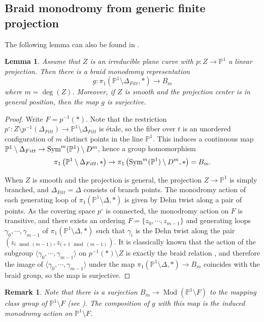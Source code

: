 \documentclass[12pt]{amsart}
\newcommand{\Sym}{\textup{Sym}}
\DeclareMathOperator{\Mod}{\mathrm{Mod}}%
\newtheorem{lemma}[theorem]{Lemma}
\newtheorem{remark}[theorem]{Remark}
\begin{document}
\subsection{Braid monodromy from generic finite projection}
The following lemma can also be found in \cite{Moishezon81}.
\begin{lemma}\label{lmm:curve-braid}
    Assume that $Z$ is an irreducible plane curve with $p\colon Z\to \mathbb P^1$ a linear projection.
    Then there is a braid monodromy representation
$$g\colon \pi_1(\mathbb P^1\setminus \Delta_{Fitt},*)\to B_m$$
where $m=\deg(Z)$. Moreover, if $Z$ is smooth and the projection center is in general position, then the map $g$ is surjective.
\end{lemma}
\begin{proof}
    Write $F= p^{-1} (\ast)$. Note that the restriction $p^{\circ}:Z\setminus p^{-1}(\Delta_{Fitt})\to\mathbb{P}^1\setminus\Delta_{Fitt}$ is \'etale, so the fiber over
$t$ is an unordered configuration of 
$m$ distinct points in the line $\mathbb P^1$. This induces a continuous map $\mathbb{P}^1\setminus\Delta_{Fitt}\to\Sym^m (\mathbb{P}^1)\setminus D^m$, hence a group homomorphism $$\pi_1\left(\mathbb{P}^1\setminus\Delta_{Fitt} ,\ast\right)\to\pi_1\left(\Sym^m (\mathbb{P}^1)\setminus D^m,\ast\right)=B_m.$$ 
    
    When $Z$ is smooth and the projection is general, the projection $Z\to\mathbb{P}^1$ is simply branched, and $\Delta_{Fitt}=\Delta$ consists of branch points. The monodromy action of each generating loop of $\pi_1\left(\mathbb{P}^1\setminus\Delta ,\ast\right)$ is given by Dehn twist along a pair of points. As the covering space $p^{\circ}$ is connected, the monodromy action on $F$ is transitive, and there exists an ordering $F=\{z_0,\dotsb, z_{m-1}\}$ and generating loops $\gamma_0,\dotsb,\gamma_{m-1}$ of $\pi_1\left(\mathbb{P}^1\setminus\Delta ,\ast\right)$ such that $\gamma_i$ is the Dehn twist along the pair $(z_{i\mod (m-1)}, z_{i+1 \mod (m-1)})$. It is classically known that the action of the subgroup $\langle\gamma_0,\dotsb,\gamma_{m-1}\rangle$ on $p^{-1} (\ast)\setminus Z$ is exactly the braid relation \cite{Artin25}, and therefore the image of $\langle\gamma_0,\dotsb,\gamma_{m-1}\rangle$ under the map $\pi_1\left(\mathbb{P}^1\setminus\Delta ,\ast\right)\to B_m$ coincides with the braid group, so the map is surjective.
\end{proof}

 
\begin{remark}\normalfont
   Note that there is a surjection $B_m\to\Mod (\mathbb{P}^1\setminus F)$ to the mapping class group of $\mathbb{P}^1\setminus F$ (see \cite[Section 9.1]{FM12}). The composition of $g$ with this map is the induced monodromy action on $\mathbb{P}^1\setminus F$. 
\end{remark}
\end{document}
